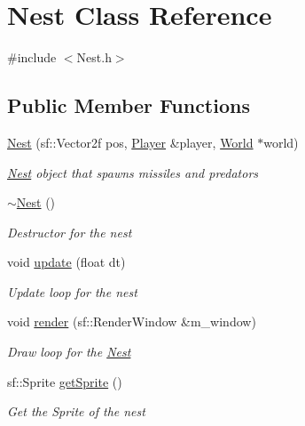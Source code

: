 \hypertarget{class_nest}{}\section{Nest Class Reference}
\label{class_nest}


{\ttfamily \#include $<$Nest.\+h$>$}

\subsection*{Public Member Functions}
\begin{DoxyCompactItemize}
\item 
\mbox{\hyperlink{class_nest_a15cb83b4a3d124d5179f8ed2fefb4829}{Nest}} (sf\+::\+Vector2f pos, \mbox{\hyperlink{class_player}{Player}} \&player, \mbox{\hyperlink{class_world}{World}} $\ast$world)
\begin{DoxyCompactList}\small\item\em \mbox{\hyperlink{class_nest}{Nest}} object that spawns missiles and predators \end{DoxyCompactList}\item 
\mbox{\hyperlink{class_nest_a3e879ba15acd31717b1dc9bdc87488d5}{$\sim$\+Nest}} ()
\begin{DoxyCompactList}\small\item\em Destructor for the nest \end{DoxyCompactList}\item 
void \mbox{\hyperlink{class_nest_a42c809be88cca1c736a446314386c703}{update}} (float dt)
\begin{DoxyCompactList}\small\item\em Update loop for the nest \end{DoxyCompactList}\item 
void \mbox{\hyperlink{class_nest_a92f137e594ffd5b06b7dd9c2c3b5f975}{render}} (sf\+::\+Render\+Window \&m\+\_\+window)
\begin{DoxyCompactList}\small\item\em Draw loop for the \mbox{\hyperlink{class_nest}{Nest}} \end{DoxyCompactList}\item 
sf\+::\+Sprite \mbox{\hyperlink{class_nest_a5e2be5f916b9c19e48ad93b1b6d67f56}{get\+Sprite}} ()
\begin{DoxyCompactList}\small\item\em Get the Sprite of the nest \end{DoxyCompactList}\item 

\end{DoxyCompactItemize}
